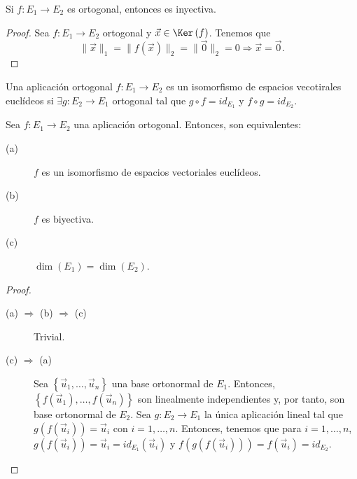 \begin{fprop}[]
\normalfont Si $\displaystyle f : E_{1} \to E_{2}$ es ortogonal, entonces es inyectiva.
\end{fprop}
\begin{proof}
Sea $\displaystyle f : E_{1} \to E_{2} $ ortogonal y $\displaystyle \vec{x} \in \Ker\left(f\right) $. Tenemos que
\[ \|\vec{x}\|_{1} = \|f\left(\vec{x}\right)\|_{2} = \|\vec{0}\|_{2} = 0 \Rightarrow \vec{x} = \vec{0} .\]
\end{proof}
\begin{fdefinition}[]
\normalfont Una aplicación ortogonal $\displaystyle f : E_{1} \to E_{2} $ es un isomorfismo de espacios vecotirales euclídeos si $\displaystyle \exists g : E_{2} \to E_{1} $ ortogonal tal que $\displaystyle g \circ f = id _{E_{1}} $ y $\displaystyle f \circ g = id _{E_{2}} $.
\end{fdefinition}
\begin{ftheorem}[]
\normalfont Sea $\displaystyle f : E_{1} \to E_{2} $ una aplicación ortogonal. Entonces, son equivalentes:
\begin{description}
\item[(a)] $\displaystyle f $ es un isomorfismo de espacios vectoriales euclídeos.
\item[(b)] $\displaystyle f $ es biyectiva.
\item[(c)] $\displaystyle \dim\left(E_{1}\right) = \dim\left(E_{2}\right) $.
\end{description}
\end{ftheorem}
\begin{proof}
\begin{description}
\item[(a) $\displaystyle \Rightarrow $ (b) $\displaystyle \Rightarrow $ (c)] Trivial.
\item[(c) $\displaystyle \Rightarrow $ (a)] Sea $\displaystyle \left\{ \vec{u}_{1}, \ldots, \vec{u}_{n}\right\}  $ una base ortonormal de $\displaystyle E_{1} $. Entonces, $\displaystyle \left\{ f\left(\vec{u}_{1}\right), \ldots, f\left(\vec{u}_{n}\right)\right\}  $ son linealmente independientes y, por tanto, son base ortonormal de $\displaystyle E_{2} $. Sea $\displaystyle g : E_{2} \to E_{1} $ la única aplicación lineal tal que $\displaystyle g\left(f\left(\vec{u}_{i}\right)\right) = \vec{u}_{i} $ con $\displaystyle i = 1, \ldots, n $.
Entonces, tenemos que para $\displaystyle i = 1, \ldots, n $, $\displaystyle g\left(f\left(\vec{u}_{i}\right)\right) = \vec{u}_{i} = id _{E_{1}}\left(\vec{u}_{i}\right) $ y $\displaystyle f\left(g\left(f\left(\vec{u}_{i}\right)\right)\right) = f\left(\vec{u}_{i}\right) = id _{E_{2}} $.
\end{description}
\end{proof}
